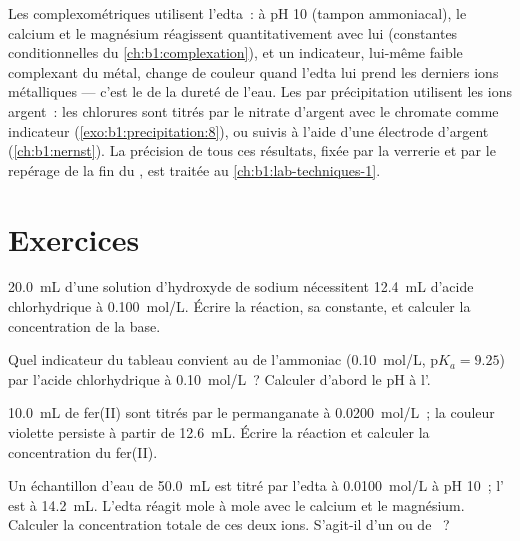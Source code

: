 Les  complexométriques utilisent l'edta~: à pH 10 (tampon
ammoniacal), le calcium et le magnésium réagissent quantitativement avec
lui (constantes conditionnelles du \cref{ch:b1:complexation}), et un
indicateur, lui-même faible complexant du métal, change de couleur quand
l'edta lui prend les derniers ions métalliques --- c'est le  de
la dureté de l'eau. Les  par précipitation utilisent les ions
argent~: les chlorures sont titrés par le nitrate d'argent avec le
chromate comme indicateur (\cref{exo:b1:precipitation:8}), ou suivis à
l'aide d'une électrode d'argent (\cref{ch:b1:nernst}). La précision de
tous ces résultats, fixée par la verrerie et par le repérage de la fin
du , est traitée au \cref{ch:b1:lab-techniques-1}.

\section{Exercices}

\begin{exercise}[$\star$]\label{exo:b1:titration-methods:1}
\qty{20.0}{mL} d'une solution d'hydroxyde de sodium nécessitent
\qty{12.4}{mL} d'acide chlorhydrique à \qty{0.100}{mol/L}. Écrire la
réaction, sa constante, et calculer la concentration de la base.
\end{exercise}

\begin{exercise}[$\star$]\label{exo:b1:titration-methods:2}
Quel indicateur du tableau convient au  de l'ammoniac
(\qty{0.10}{mol/L},
$\mathrm{p}K_a = 9.25$) par l'acide chlorhydrique à \qty{0.10}{mol/L}~?
Calculer d'abord le pH à l'.
\end{exercise}

\begin{exercise}[$\star$]\label{exo:b1:titration-methods:3}
\qty{10.0}{mL} de fer(II) sont titrés par le permanganate à
\qty{0.0200}{mol/L}~; la couleur violette persiste à partir de
\qty{12.6}{mL}. Écrire la réaction et calculer la concentration du
fer(II).
\end{exercise}

\begin{exercise}[$\star$]\label{exo:b1:titration-methods:4}
Un échantillon d'eau de \qty{50.0}{mL} est titré par l'edta à
\qty{0.0100}{mol/L} à pH 10~; l' est à \qty{14.2}{mL}.
L'edta réagit mole à mole avec le calcium et le magnésium. Calculer la
concentration totale de ces deux ions. S'agit-il d'un 
ou de ~?
\end{exercise}

